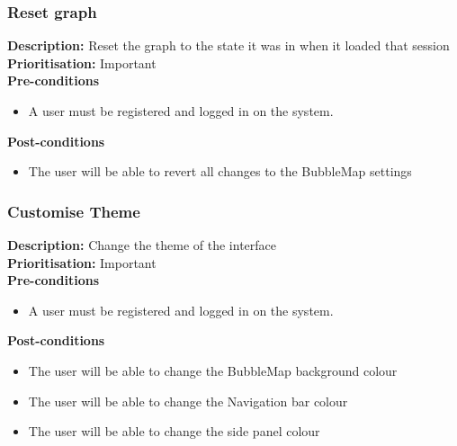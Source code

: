 \documentclass[hidelinks,english]{article}
\begin{document}
    		\subsubsection{Reset graph}
				\textbf{Description:} Reset the graph to the state it was in when it loaded that session\\
			    \textbf{Prioritisation:} Important\\
      			\textbf{Pre-conditions}
			    \begin{itemize}
			        \item A user must be registered and logged in on the system.
			    \end{itemize}
    			\textbf{Post-conditions}
			    \begin{itemize}
			    	\item The user will be able to revert all changes to the BubbleMap settings
    			\end{itemize}
    			
    	    \subsubsection{Customise Theme}
				\textbf{Description:} Change the theme of the interface\\
			    \textbf{Prioritisation:} Important\\
      			\textbf{Pre-conditions}
			    \begin{itemize}
			        \item A user must be registered and logged in on the system.
			    \end{itemize}
    			\textbf{Post-conditions}
			    \begin{itemize}
			    	\item The user will be able to change the BubbleMap background colour
			    	\item The user will be able to change the Navigation bar colour
			    	\item The user will be able to change the side panel colour
    			\end{itemize}
    	
\end{document}
